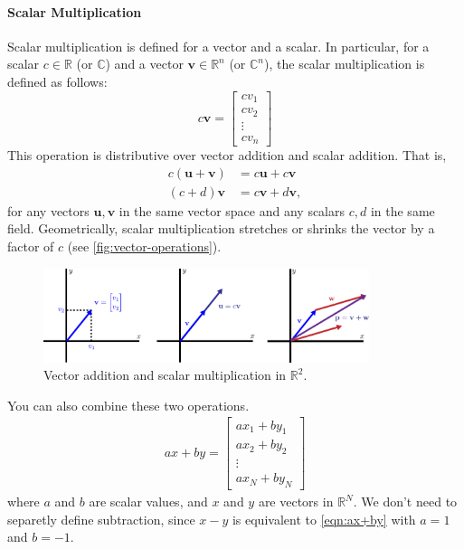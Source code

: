 \paragraph*{Scalar Multiplication}
Scalar multiplication is defined for a vector and a scalar.
In particular, for a scalar $ c \in \mathbb{R} $ (or $ \mathbb{C} $) and a vector $ \mathbf{v}\in\mathbb{R}^{n} $ (or $\mathbb{C}^n$), the scalar multiplication is defined as follows:
\begin{equation*}
    c\mathbf{v} = \begin{bmatrix} c v_1 \\ c v_2 \\ \vdots \\ c v_n \end{bmatrix}
\end{equation*}
This operation is distributive over vector addition and scalar addition. That is,
\begin{align*}
  c(\mathbf{u} + \mathbf{v}) &= c\mathbf{u} + c\mathbf{v} \\
  (c + d)\mathbf{v} &= c\mathbf{v} + d\mathbf{v},
\end{align*}
for any vectors $ \mathbf{u}, \mathbf{v} $ in the same vector space and any scalars $ c, d $ in the same field.
Geometrically, scalar multiplication stretches or shrinks the vector by a factor of $ c $ (see \autoref{fig:vector-operations}).

\begin{figure}[H]
  \centering
  \includegraphics[width=0.85\textwidth]{figs/linear-algebra/vector-operations.pdf}
  \caption{Vector addition and scalar multiplication in $ \mathbb{R}^2 $.}
  \label{fig:vector-operations}
\end{figure}

You can also combine these two operations.
\begin{align}\label{eqn:ax+by}
  ax + by = \begin{bmatrix}
    a x_1 + b y_1 \\
    a x_2 + b y_2 \\
    \vdots \\
    a x_N + b y_N
  \end{bmatrix}
\end{align}
where $a$ and $b$ are scalar values, and $x$ and $y$ are vectors in $\mathbb{R}^N$.
We don't need to separetly define subtraction, since $x-y$ is equivalent to \cref{eqn:ax+by} with $a=1$ and $b=-1$.



